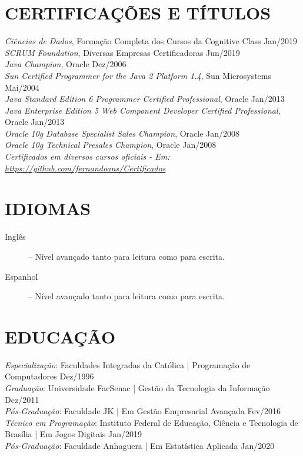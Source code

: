 \documentclass{res}
\begin{document}
\begin{resume}
		\section{CERTIFICAÇÕES E TÍTULOS}
		\vspace{8pt}
		{\sl Ciências de Dados}, Formação Completa dos Cursos da Cognitive Class \hfill Jan/2019 \\
		{\sl SCRUM Foundation}, Diversas Empresas Certificadoras \hfill Jun/2019 \\
		{\sl Java Champion}, Oracle \hfill Dez/2006 \\
		{\sl Sun Certified Programmer for the Java 2 Platform 1.4}, Sun Microsystems \hfill Mai/2004 \\
		{\sl Java Standard Edition 6 Programmer Certified Professional}, Oracle \hfill Jan/2013 \\
		{\sl Java Enterprise Edition 5 Web Component Developer Certified Professional}, Oracle \hfill Jan/2013 \\
		{\sl Oracle 10g Database Specialist Sales Champion}, Oracle \hfill Jan/2008 \\
		{\sl Oracle 10g Technical Presales Champion}, Oracle \hfill Jan/2008 \\
		{\sl Certificados em diversos cursos oficiais - Em: \url{https://github.com/fernandoans/Certificados}}
		
		\section{IDIOMAS} 
		\vspace{18pt}
		\begin{description}
			\item[Inglês] -- Nível avançado tanto para leitura como para escrita.
			\item[Espanhol] -- Nível avançado tanto para leitura como para escrita.
		\end{description}
		
		\section{EDUCAÇÃO}
		\vspace{8pt} 
		{\sl Especialização}: Faculdades Integradas da Católica | Programação de Computadores 
		\hfill Dez/1996 \\
		{\sl Graduação}: Universidade FacSenac | Gestão da Tecnologia da Informação     
		\hfill Dez/2011 \\
		{\sl Pós-Graduação}: Faculdade JK | Em Gestão Empresarial Avançada 
		\hfill Fev/2016 \\
		{\sl Técnico em Programação}: Instituto Federal de Educação, Ciência e Tecnologia de Brasília | Em Jogos Digitais
		\hfill Jan/2019 \\
		{\sl Pós-Graduação}: Faculdade Anhaguera | Em Estatística Aplicada
		\hfill Jan/2020 \\
		

\end{resume}
\end{document}
